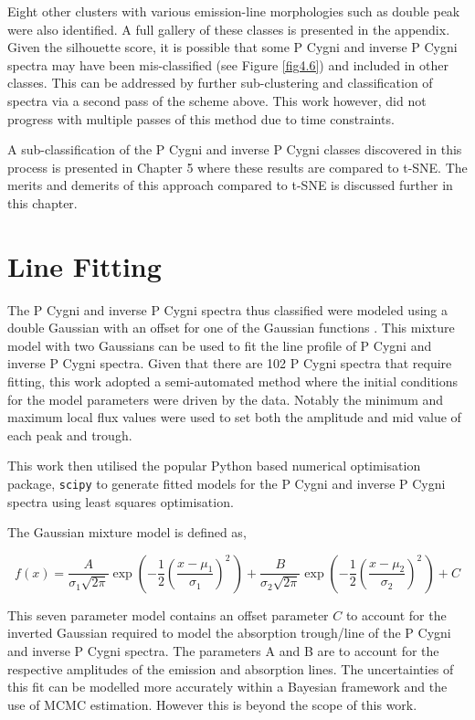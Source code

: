 Eight other clusters with various emission-line morphologies such as double peak were also identified. A full gallery of these classes is presented in the appendix. Given the silhouette score, it is possible that some P Cygni and inverse P Cygni spectra may have been mis-classified (see Figure \ref{fig4.6}) and included in other classes. This can be addressed by further sub-clustering and classification of spectra via a second pass of the scheme above. This work however, did not progress with multiple passes of this method due to time constraints. 

A sub-classification of the P Cygni and inverse P Cygni classes discovered in this process is presented in Chapter 5 where these results are compared to t-SNE. The merits and demerits of this approach compared to t-SNE is discussed further in this chapter. 

\section{Line Fitting}

The P Cygni and inverse P Cygni spectra thus classified were modeled using a double Gaussian with an offset for one of the Gaussian functions \cite{traven2015gaia}\cite{traven2017galah}\cite{zhang2021catalog}. This mixture model with two Gaussians can be used to fit the line profile of P Cygni and inverse P Cygni spectra. Given that there are 102 P Cygni spectra that require fitting, this work adopted a semi-automated method where the initial conditions for the model parameters were driven by the data. Notably the minimum and maximum local flux values were used to set both the amplitude and mid value of each peak and trough.

This work then utilised the popular Python based numerical optimisation package, \texttt{scipy}\cite{2020SciPy-NMeth} to generate fitted models for the P Cygni and inverse P Cygni spectra using least squares optimisation.

The Gaussian mixture model is defined as, 

\begin{equation}
    f(x) = \frac{A}{\sigma_1\sqrt{2\pi}} 
  \exp\left( -\frac{1}{2}\left(\frac{x-\mu_1}{\sigma_1}\right)^{\!2}\,\right) + \frac{B}{\sigma_2\sqrt{2\pi}} 
  \exp\left( -\frac{1}{2}\left(\frac{x-\mu_2}{\sigma_2}\right)^{\!2}\,\right) + C
\end{equation}


This seven parameter model contains an offset parameter $C$ to account for the inverted Gaussian required to model the absorption trough/line of the P Cygni and inverse P Cygni spectra. The parameters A and B are to account for the respective amplitudes of the emission and absorption lines. The uncertainties of this fit can be modelled more accurately within a Bayesian framework and the use of MCMC estimation\cite{hogg2010data}. However this is beyond the scope of this work.

